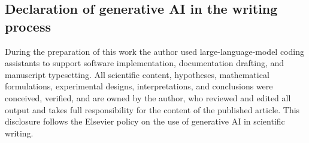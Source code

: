 \documentclass[a4paper,fleqn]{cas-dc}
\begin{document}
\subsection*{Declaration of generative AI in the writing process}
During the preparation of this work the author used large-language-model coding assistants to support software implementation, documentation drafting, and manuscript typesetting. All scientific content, hypotheses, mathematical formulations, experimental designs, interpretations, and conclusions were conceived, verified, and are owned by the author, who reviewed and edited all output and takes full responsibility for the content of the published article. This disclosure follows the Elsevier policy on the use of generative AI in scientific writing.



\end{document}
